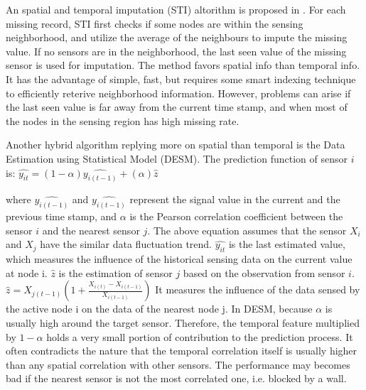 An spatial and temporal imputation (STI) altorithm is proposed in \cite{li2008spatial}. 
For each missing record, STI first checks if some nodes are within the sensing neighborhood, and utilize 
the average of the neighbours to impute the missing value. If no sensors are in the neighborhood, the last seen value of the missing sensor is used for imputation. The method favors spatial info than temporal info. It has the advantage of simple, fast, but requires some smart indexing technique to efficiently reterive neighborhood information. 
However, problems can arise if the last seen value is far away from the current time stamp, and when most of the nodes in the sensing region has high missing rate. 

Another hybrid algorithm replying more on spatial than temporal is the Data Estimation using Statistical Model (DESM)\cite{li2008data}.  
The prediction function of sensor $i$ is:
$\hat{y_{it}} = (1-\alpha)\hat{y_{i(t-1)}} + (\alpha)\hat{z}$

where $\hat{y_{i(t-1)}}$ and $\hat{y_{i(t-1)}}$ represent the signal value in the current and the previous time stamp, and $\alpha$ is the Pearson correlation coefficient between the sensor $i$ and the nearest sensor $j$.
The above equation assumes that the sensor $X_i$ and $X_j$ have the similar data fluctuation trend. 
$\hat{y_{it}}$ is the last estimated value, which measures the influence of the historical sensing data on the current value at node i. 
$\hat{z}$ is the estimation of sensor $j$ based on the observation from sensor $i$. 
$\hat{z} = X_{j(t-1)}(1+\frac{X_{i(t)}-X_{i(t-1)}}{X_{i(t-1)}})$
It measures the influence of the data sensed by the active node i on the data of the nearest node j.  
In DESM, because $\alpha$ is usually high around the target sensor. Therefore, the temporal feature multiplied by $1-\alpha$ holds a very small portion of contribution to the prediction process. It often contradicts the nature that the temporal correlation itself is usually higher than any spatial correlation with other sensors. The performance may becomes bad if the nearest sensor is not the most correlated one, i.e. blocked by a wall.


